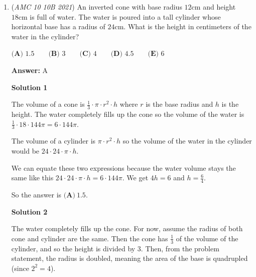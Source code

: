 \begin{enumerate}
 



\textbf{Solution 6 (Working Backwards Approach, Super Easy!)}

The last thing that happened was the reflection over the line $y = -x$, so we reverse that by reflecting $(-6,3)$ over $y = -x$ to get $(-3,6)$. Now, we have to rotate it $\textbf{clockwise}$, to reverse the first step. To rotate $(-3,6)$ over the point $(1,5)$ clockwise 90 degrees, we can subtract $1$ from each x-coordinate and subtract $5$ from each y-coordinate. That way, we only have to rotate $(-4,1)$ clockwise 90 degrees over the origin $(0,0)$. This is pretty easy to do in your head, so you get $(1,4)$. But we are not, done, we still have to add $1$ to each x-coordinate and add $5$ to each y-coordinate, to get $(2,9)$, so our final answer is $9 - 2 = 7$, which is $\boxed{\textbf{(D)} ~7}$.

 


	\item (\textit{AMC 10 10B 2021}) An inverted cone with base radius $12 \text{cm}$ and height $18\text{cm}$ is full of water. The water is poured into a tall cylinder whose horizontal base has a radius of $24\text{cm}$. What is the height in centimeters of the water in the cylinder?


 $\textbf{(A) }1.5 \qquad \textbf{(B) }3 \qquad \textbf{(C) }4 \qquad \textbf{(D) }4.5 \qquad \textbf{(E) }6$

 \textbf{Answer: }A



\textbf{Solution 1}

The volume of a cone is $\frac{1}{3} \cdot\pi \cdot r^2 \cdot h$ where $r$ is the base radius and $h$ is the height. The water completely fills up the cone so the volume of the water is $\frac{1}{3}\cdot18\cdot144\pi = 6\cdot144\pi$.

 The volume of a cylinder is $\pi \cdot r^2 \cdot h$ so the volume of the water in the cylinder would be $24\cdot24\cdot\pi\cdot h$.

 We can equate these two expressions because the water volume stays the same like this $24\cdot24\cdot\pi\cdot h = 6\cdot144\pi$. We get $4h = 6$ and $h=\frac{6}{4}$.

 So the answer is $\boxed{\textbf{(A)} ~1.5}.$




\textbf{Solution 2}

The water completely fills up the cone. For now, assume the radius of both cone and cylinder are the same. Then the cone has $\frac{1}{3}$ of the volume of the cylinder, and so the height is divided by $3$. Then, from the problem statement, the radius is doubled, meaning the area of the base is quadrupled (since $2^2 = 4$).


\end{enumerate}
